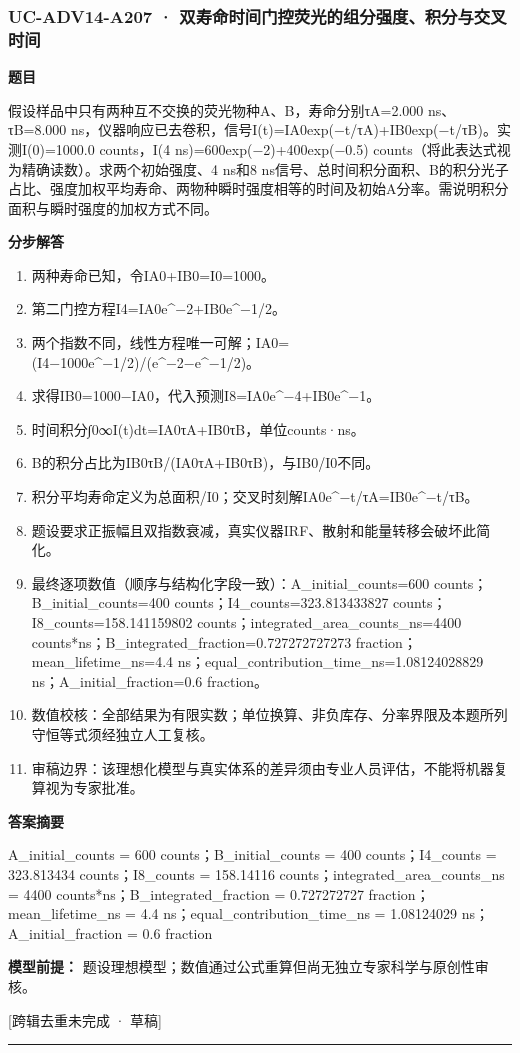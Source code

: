 \documentclass[UTF8,11pt,a4paper]{ctexart}
\begin{document}
\subsubsection*{UC-ADV14-A207 · 双寿命时间门控荧光的组分强度、积分与交叉时间}
\noindent\textbf{题目}\par
假设样品中只有两种互不交换的荧光物种A、B，寿命分别τA=2.000 ns、τB=8.000 ns，仪器响应已去卷积，信号I(t)=IA0exp(−t/τA)+IB0exp(−t/τB)。实测I(0)=1000.0 counts，I(4 ns)=600exp(−2)+400exp(−0.5) counts（将此表达式视为精确读数）。求两个初始强度、4 ns和8 ns信号、总时间积分面积、B的积分光子占比、强度加权平均寿命、两物种瞬时强度相等的时间及初始A分率。需说明积分面积与瞬时强度的加权方式不同。\par
\medskip\noindent\textbf{分步解答}
\begin{enumerate}
\item 两种寿命已知，令IA0+IB0=I0=1000。
\item 第二门控方程I4=IA0e\textasciicircum{}−2+IB0e\textasciicircum{}−1/2。
\item 两个指数不同，线性方程唯一可解；IA0=(I4−1000e\textasciicircum{}−1/2)/(e\textasciicircum{}−2−e\textasciicircum{}−1/2)。
\item 求得IB0=1000−IA0，代入预测I8=IA0e\textasciicircum{}−4+IB0e\textasciicircum{}−1。
\item 时间积分∫0∞I(t)dt=IA0τA+IB0τB，单位counts·ns。
\item B的积分占比为IB0τB/(IA0τA+IB0τB)，与IB0/I0不同。
\item 积分平均寿命定义为总面积/I0；交叉时刻解IA0e\textasciicircum{}−t/τA=IB0e\textasciicircum{}−t/τB。
\item 题设要求正振幅且双指数衰减，真实仪器IRF、散射和能量转移会破坏此简化。
\item 最终逐项数值（顺序与结构化字段一致）：A\_initial\_counts=600 counts；B\_initial\_counts=400 counts；I4\_counts=323.813433827 counts；I8\_counts=158.141159802 counts；integrated\_area\_counts\_ns=4400 counts*ns；B\_integrated\_fraction=0.727272727273 fraction；mean\_lifetime\_ns=4.4 ns；equal\_contribution\_time\_ns=1.08124028829 ns；A\_initial\_fraction=0.6 fraction。
\item 数值校核：全部结果为有限实数；单位换算、非负库存、分率界限及本题所列守恒等式须经独立人工复核。
\item 审稿边界：该理想化模型与真实体系的差异须由专业人员评估，不能将机器复算视为专家批准。
\end{enumerate}
\noindent\textbf{答案摘要}\par
A\_initial\_counts = 600 counts；B\_initial\_counts = 400 counts；I4\_counts = 323.813434 counts；I8\_counts = 158.14116 counts；integrated\_area\_counts\_ns = 4400 counts*ns；B\_integrated\_fraction = 0.727272727 fraction；mean\_lifetime\_ns = 4.4 ns；equal\_contribution\_time\_ns = 1.08124029 ns；A\_initial\_fraction = 0.6 fraction\par
\noindent\textbf{模型前提：}
题设理想模型；数值通过公式重算但尚无独立专家科学与原创性审核。\par
\noindent\textcolor{red!65!black}{[跨辑去重未完成 · 草稿]} \par
\medskip\hrule\medskip
{}
\end{document}
